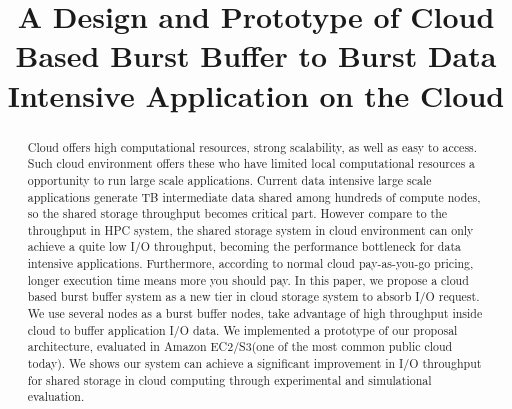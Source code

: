 \documentclass[10pt, conference, compsocconf]{IEEEtran}
\begin{document}
\newcommand {\xtq}[1] {\begin{color}{red}{[XTQ : #1]}\end{color}}
\title{A Design and Prototype of Cloud Based Burst Buffer to Burst Data Intensive Application on the
Cloud}


\author{
	\and
	\and
}

\maketitle

\begin{abstract}
Cloud offers high computational resources, strong scalability, as well as easy to access. 
Such cloud environment offers these who have limited local computational resources a opportunity to
run large scale applications.
Current data intensive large scale applications generate TB intermediate data shared among hundreds
of compute nodes, so the shared storage throughput becomes critical part.
However compare to the throughput in HPC system, the shared storage
system in cloud environment can only achieve a quite low I/O throughput, becoming the
performance bottleneck for data intensive applications.
Furthermore, according to normal cloud pay-as-you-go pricing, longer execution time means more you
should pay.
In this paper, we propose a cloud based burst
buffer system as a new tier in cloud storage system to absorb I/O request.
We use several nodes as a burst buffer nodes, take advantage of high throughput inside cloud to
buffer application I/O data.
We implemented a prototype of our proposal architecture, evaluated in Amazon EC2/S3(one of the most
common public cloud today).
We shows our system can achieve a significant improvement in I/O throughput for shared storage
in cloud computing through experimental and simulational evaluation.
\end{abstract}
\end{document}

